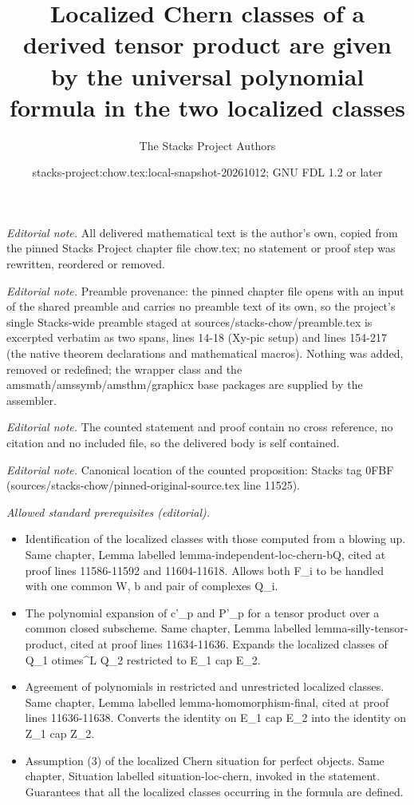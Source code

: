 \documentclass[10pt,a4paper]{amsart}
\title{Localized Chern classes of a derived tensor product are given by the universal polynomial formula in the two localized classes}
\author{The Stacks Project Authors}
\date{stacks-project:chow.tex:local-snapshot-20261012; GNU FDL 1.2 or later}
\theoremstyle{plain}
\theoremstyle{definition}
\theoremstyle{remark}
\numberwithin{equation}{subsection}
\begin{document}
\maketitle
\noindent\textit{Editorial note.} All delivered mathematical text is the author's own, copied from the pinned Stacks Project chapter file chow.tex; no statement or proof step was rewritten, reordered or removed.\par\medskip
\noindent\textit{Editorial note.} Preamble provenance: the pinned chapter file opens with an input of the shared preamble and carries no preamble text of its own, so the project's single Stacks-wide preamble staged at sources/stacks-chow/preamble.tex is excerpted verbatim as two spans, lines 14-18 (Xy-pic setup) and lines 154-217 (the native theorem declarations and mathematical macros). Nothing was added, removed or redefined; the wrapper class and the amsmath/amssymb/amsthm/graphicx base packages are supplied by the assembler.\par\medskip
\noindent\textit{Editorial note.} The counted statement and proof contain no cross reference, no citation and no included file, so the delivered body is self contained.\par\medskip
\noindent\textit{Editorial note.} Canonical location of the counted proposition: Stacks tag 0FBF (sources/stacks-chow/pinned-original-source.tex line 11525).\par\medskip
\noindent\textit{Allowed standard prerequisites (editorial).}\begin{itemize}
\item Identification of the localized classes with those computed from a blowing up. Same chapter, Lemma labelled lemma-independent-loc-chern-bQ, cited at proof lines 11586-11592 and 11604-11618. Allows both F\_i to be handled with one common W, b and pair of complexes Q\_i.
\item The polynomial expansion of c'\_p and P'\_p for a tensor product over a common closed subscheme. Same chapter, Lemma labelled lemma-silly-tensor-product, cited at proof lines 11634-11636. Expands the localized classes of Q\_1 otimes\textasciicircum{}L Q\_2 restricted to E\_1 cap E\_2.
\item Agreement of polynomials in restricted and unrestricted localized classes. Same chapter, Lemma labelled lemma-homomorphism-final, cited at proof lines 11636-11638. Converts the identity on E\_1 cap E\_2 into the identity on Z\_1 cap Z\_2.
\item Assumption (3) of the localized Chern situation for perfect objects. Same chapter, Situation labelled situation-loc-chern, invoked in the statement. Guarantees that all the localized classes occurring in the formula are defined.
\end{itemize}\medskip
\end{document}

